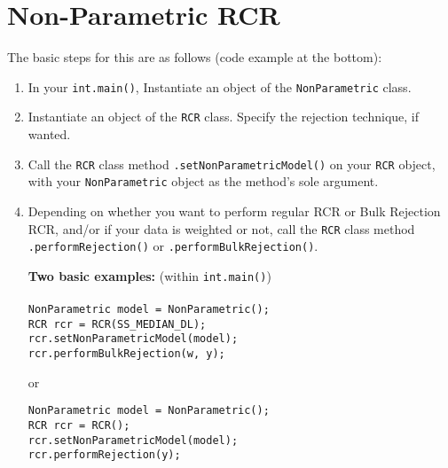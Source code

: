 \documentclass[12pt]{article}
\begin{document}
\section{Non-Parametric RCR}
The basic steps for this are as follows (code example at the bottom):
\begin{enumerate}
	\item In your \texttt{int.main()}, Instantiate an object of the \texttt{NonParametric} class.
	\item Instantiate an object of the \texttt{RCR} class. Specify the rejection technique, if wanted.
	\item Call the \texttt{RCR} class method \texttt{.setNonParametricModel()} on your \texttt{RCR} object, with your \texttt{NonParametric} object as the method's sole argument.
	\item Depending on whether you want to perform regular RCR or Bulk Rejection RCR, and/or if your data is weighted or not, call the \texttt{RCR} class method \texttt{.performRejection()} or \texttt{.performBulkRejection()}.
	
	\newpage
	\par \textbf{Two basic examples:} (within \texttt{int.main()})
	\\
	\\\texttt{NonParametric model = NonParametric();}
	\\\texttt{RCR rcr = RCR(SS\_MEDIAN\_DL);}
	\\\texttt{rcr.setNonParametricModel(model);}
	\\\texttt{rcr.performBulkRejection(w, y);}
	
	or
	
	\texttt{NonParametric model = NonParametric();}
	\\\texttt{RCR rcr = RCR();}
	\\\texttt{rcr.setNonParametricModel(model);}
	\\\texttt{rcr.performRejection(y);}
\end{enumerate}
\end{document}
